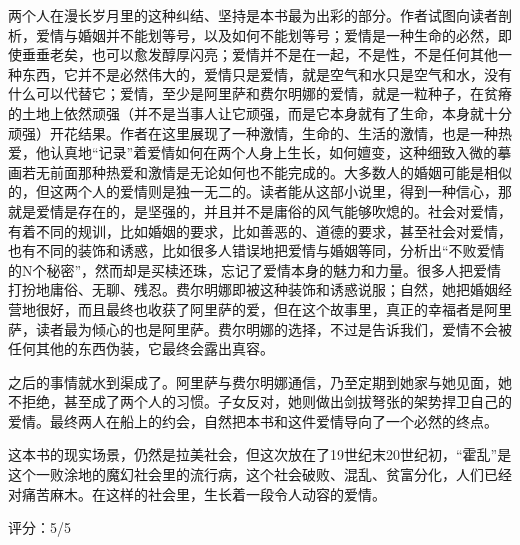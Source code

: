 两个人在漫长岁月里的这种纠结、坚持是本书最为出彩的部分。作者试图向读者剖析，爱情与婚姻并不能划等号，以及如何不能划等号；爱情是一种生命的必然，即使垂垂老矣，也可以愈发醇厚闪亮；爱情并不是在一起，不是性，不是任何其他一种东西，它并不是必然伟大的，爱情只是爱情，就是空气和水只是空气和水，没有什么可以代替它；爱情，至少是阿里萨和费尔明娜的爱情，就是一粒种子，在贫瘠的土地上依然顽强（并不是当事人让它顽强，而是它本身就有了生命，本身就十分顽强）开花结果。作者在这里展现了一种激情，生命的、生活的激情，也是一种热爱，他认真地“记录”着爱情如何在两个人身上生长，如何嬗变，这种细致入微的摹画若无前面那种热爱和激情是无论如何也不能完成的。大多数人的婚姻可能是相似的，但这两个人的爱情则是独一无二的。读者能从这部小说里，得到一种信心，那就是爱情是存在的，是坚强的，并且并不是庸俗的风气能够吹熄的。社会对爱情，有着不同的规训，比如婚姻的要求，比如善恶的、道德的要求，甚至社会对爱情，也有不同的装饰和诱惑，比如很多人错误地把爱情与婚姻等同，分析出“不败爱情的N个秘密”，然而却是买椟还珠，忘记了爱情本身的魅力和力量。很多人把爱情打扮地庸俗、无聊、残忍。费尔明娜即被这种装饰和诱惑说服；自然，她把婚姻经营地很好，而且最终也收获了阿里萨的爱，但在这个故事里，真正的幸福者是阿里萨，读者最为倾心的也是阿里萨。费尔明娜的选择，不过是告诉我们，爱情不会被任何其他的东西伪装，它最终会露出真容。

之后的事情就水到渠成了。阿里萨与费尔明娜通信，乃至定期到她家与她见面，她不拒绝，甚至成了两个人的习惯。子女反对，她则做出剑拔弩张的架势捍卫自己的爱情。最终两人在船上的约会，自然把本书和这件爱情导向了一个必然的终点。

这本书的现实场景，仍然是拉美社会，但这次放在了19世纪末20世纪初，“霍乱”是这个一败涂地的魔幻社会里的流行病，这个社会破败、混乱、贫富分化，人们已经对痛苦麻木。在这样的社会里，生长着一段令人动容的爱情。

评分：5/5
